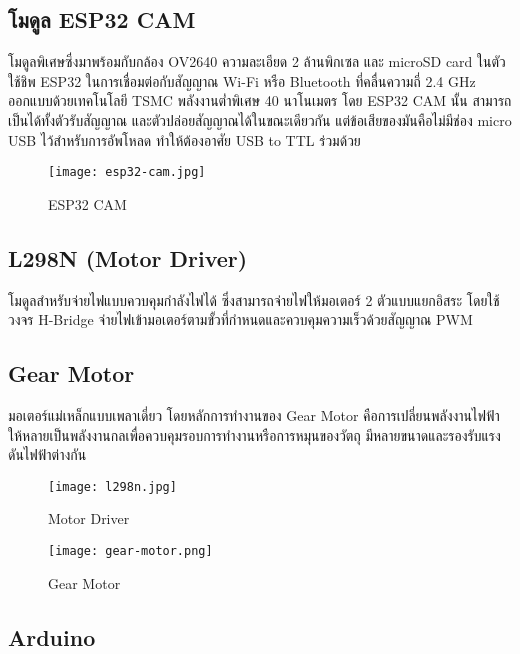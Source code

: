 \subsection{โมดูล ESP32 CAM}
โมดูลพิเศษซึ่งมาพร้อมกับกล้อง OV2640 ความละเอียด 2 ล้านพิกเซล และ microSD card ในตัว ใช้ชิพ ESP32 ในการเชื่อมต่อกับสัญญาณ Wi-Fi หรือ Bluetooth ที่คลื่นความถี่ 2.4 GHz
ออกแบบด้วยเทคโนโลยี TSMC พลังงานต่ำพิเศษ 40 นาโนเมตร โดย ESP32 CAM นั้น สามารถเป็นได้ทั้งตัวรับสัญญาณ และตัวปล่อยสัญญาณได้ในขณะเดียวกัน แต่ข้อเสียของมันคือไม่มีช่อง micro USB
ไว้สำหรับการอัพโหลด ทำให้ต้องอาศัย USB to TTL ร่วมด้วย \cite{ESP32CAM}
\begin{figure}[ht]
    \centering
    \texttt{[image: esp32-cam.jpg]}
    \caption{ESP32 CAM}
    \label{fig:esp32-cam}
\end{figure}

\subsection{L298N (Motor Driver)}
โมดูลสำหรับจ่ายไฟแบบควบคุมกำลังไฟได้ ซึ่งสามารถจ่ายไฟให้มอเตอร์ 2 ตัวแบบแยกอิสระ โดยใช้วงจร H-Bridge จ่ายไฟเข้ามอเตอร์ตามขั้วที่กำหนดและควบคุมความเร็วด้วยสัญญาณ PWM

\subsection{Gear Motor}
มอเตอร์แม่เหล็กแบบเพลาเดี่ยว โดยหลักการทำงานของ Gear Motor คือการเปลี่ยนพลังงานไฟฟ้าให้หลายเป็นพลังงานกลเพื่อควบคุมรอบการทำงานหรือการหมุนของวัตถุ มีหลายขนาดและรองรับแรงดันไฟฟ้าต่างกัน
\begin{figure}
    \centering
    \begin{minipage}{.5\textwidth}
      \centering
      \texttt{[image: l298n.jpg]}
      \caption{Motor Driver}
      \label{fig:l298n}
    \end{minipage}%
    \begin{minipage}{.5\textwidth}
      \centering
      \texttt{[image: gear-motor.png]}
      \caption{Gear Motor}
      \label{fig:gear-motor}
    \end{minipage}
\end{figure}

\subsection{Arduino}
